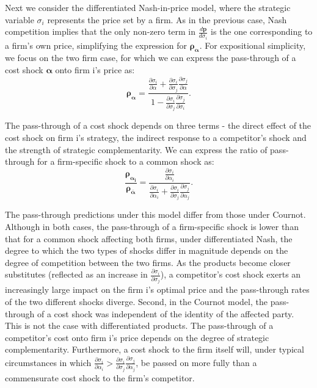 \documentclass[12pt]{article}
\begin{document}
Next we consider the differentiated Nash-in-price model, where the strategic variable $\sigma_{i}$ represents the price set by a firm. As in the previous case, Nash competition implies that the only non-zero term in $\frac{d\boldsymbol{p}}{d\sigma_{i}}$ is the one corresponding to a firm's own price, simplifying the expression for \textbf{$\boldsymbol{\rho_{\alpha}}$}. For expositional simplicity, we focus on the two firm case, for which we can express the pass-through of a cost shock $\boldsymbol{\alpha}$ onto firm i's price as: \textbf{
\begin{equation}
\boldsymbol{\rho_{\alpha}}=\frac{\frac{\partial\sigma_{i}}{\partial\alpha}+\frac{\partial\sigma_{i}}{\partial\sigma_{j}}\frac{\partial\sigma_{j}}{\partial\alpha}}{1-\frac{\partial\sigma_{i}}{\partial\sigma_{j}}\frac{\partial\sigma_{j}}{\partial\sigma_{i}}}.\label{eq:NIP pass-through}
\end{equation}
}

The pass-through of a cost shock depends on three terms - the direct effect of the cost shock on firm i's strategy, the indirect response to a competitor's shock and the strength of strategic complementarity. We can express the ratio of pass-through for a firm-specific shock to a common shock as: \textbf{
\begin{equation}
\frac{\boldsymbol{\rho_{\alpha_{i}}}}{\boldsymbol{\rho_{\bar{\alpha}}}}=\frac{\frac{\partial\sigma_{i}}{\partial\alpha_{i}}}{\frac{\partial\sigma_{i}}{\partial\alpha_{i}}+\frac{\partial\sigma_{i}}{\partial\sigma_{j}}\frac{\partial\sigma_{j}}{\partial\alpha_{j}}}.\label{eq:NiP ratio}
\end{equation}
}

The pass-through predictions under this model differ from those under Cournot. Although in both cases, the pass-through of a firm-specific shock is lower than that for a common shock affecting both firms, under differentiated Nash, the degree to which the two types of shocks differ in magnitude depends on the degree of competition between the two firms. As the products become closer substitutes (reflected as an increase in $\frac{\partial\sigma_{i}}{\partial\sigma_{j}}$), a competitor's cost shock exerts an increasingly large impact on the firm i's optimal price and the pass-through rates of the two different shocks diverge. Second, in the Cournot model, the pass-through of a cost shock was independent of the identity of the affected party. This is not the case with differentiated products. The pass-through of a competitor's cost onto firm i's price depends on the degree of strategic complementarity. Furthermore, a cost shock to the firm itself will, under typical circumstances in which $\frac{\partial\sigma_{i}}{\partial\alpha_{i}}>\frac{\partial\sigma_{i}}{\partial\sigma_{j}}\frac{\partial\sigma_{j}}{\partial\alpha_{j}}$, be passed on more fully than a commensurate cost shock to the firm's competitor.
\end{document}
